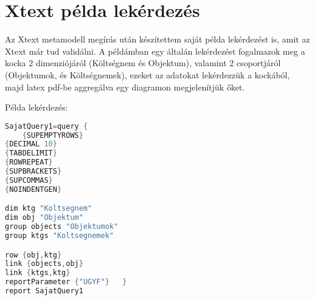 \section{Xtext példa lekérdezés}

Az Xtext metamodell megírás után készítettem saját példa lekérdezést is, amit az
Xtext már tud validálni. A példámban egy általán lekérdezést fogalmazok meg a
kocka 2 dimenziójáról (Költségnem és Objektum), valamint 2 csoportjáról
(Objektumok, és Költségnemek), ezeket az adatokat lekérdezzük a kockából, majd
latex pdf-be aggregálva egy diagramon megjelenítjük őket.

Példa lekérdezés:
\begin{lstlisting}[language=java,morekeywords={dim,group,row,link,reportParameter,report,query},alsoletter={-},breaklines=true]
SajatQuery1=query {
	{SUPEMPTYROWS}
{DECIMAL 10}
{TABDELIMIT}
{ROWREPEAT}
{SUPBRACKETS}
{SUPCOMMAS}
{NOINDENTGEN}

dim ktg "Koltsegnem"
dim obj "Objektum"
group objects "Objektumok"
group ktgs "Koltsegnemek"

row {obj,ktg}
link {objects,obj}
link {ktgs,ktg}
reportParameter {"UGYF"}   }
report SajatQuery1
\end{lstlisting}